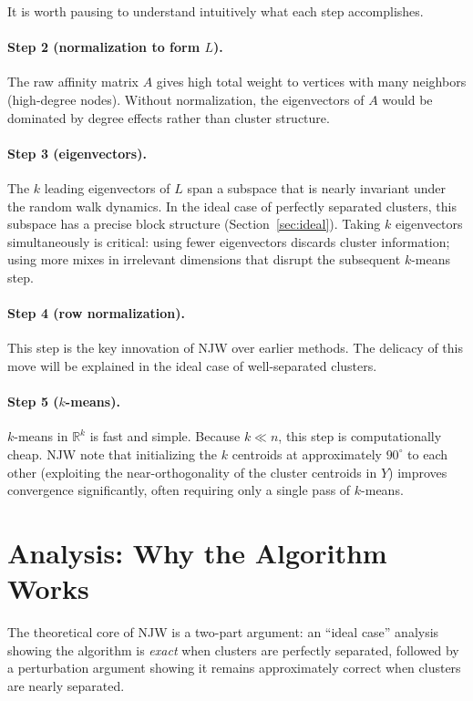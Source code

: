 \documentclass[11pt]{article}
\theoremstyle{plain}
\theoremstyle{definition}
\begin{document}
It is worth pausing to understand intuitively what each step accomplishes.

\paragraph{Step 2 (normalization to form $L$).}
The raw affinity matrix $A$ gives high total weight to vertices with many neighbors (high-degree nodes). Without normalization, the eigenvectors of $A$ would be dominated by degree effects rather than cluster structure. 

\paragraph{Step 3 (eigenvectors).}
The $k$ leading eigenvectors of $L$ span a subspace that is nearly invariant under the random walk dynamics. In the ideal case of perfectly separated clusters, this subspace has a precise block structure (Section~\ref{sec:ideal}). Taking $k$ eigenvectors simultaneously is critical: using fewer eigenvectors discards cluster information; using more mixes in irrelevant dimensions that disrupt the subsequent $k$-means step.

\paragraph{Step 4 (row normalization).}
This step is the key innovation of NJW over earlier methods. The delicacy of this move will be explained in the ideal case of well-separated clusters.

\paragraph{Step 5 ($k$-means).}
$k$-means in $\mathbb{R}^k$ is fast and simple. Because $k \ll n$, this step is computationally cheap. NJW note that initializing the $k$ centroids at approximately $90^\circ$ to each other (exploiting the near-orthogonality of the cluster centroids in $Y$) improves convergence significantly, often requiring only a single pass of $k$-means.

\section{Analysis: Why the Algorithm Works}

The theoretical core of NJW is a two-part argument: an ``ideal case'' analysis showing the algorithm is \emph{exact} when clusters are perfectly separated, followed by a perturbation argument showing it remains approximately correct when clusters are nearly separated.
\end{document}

